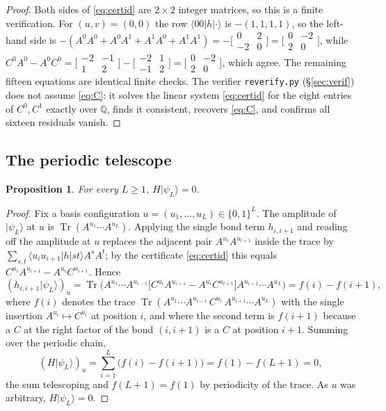 \documentclass[11pt]{amsart}
\newcommand{\Tr}{\operatorname{Tr}}
\newcommand{\ket}[1]{\lvert #1 \rangle}
\newcommand{\bra}[1]{\langle #1 \rvert}
\newcommand{\psiL}{\ket{\psi_L}}
\theoremstyle{plain}
\newtheorem{proposition}[theorem]{Proposition}
\theoremstyle{definition}
\theoremstyle{remark}
\begin{document}
\begin{proof}
Both sides of \eqref{eq:certid} are $2\times2$ integer matrices, so this is
a finite verification. For $(u,v)=(0,0)$ the row $\bra{00}h\ket{\cdot}$ is
$-(1,1,1,1)$, so the left-hand side is
$-(A^0A^0+A^0A^1+A^1A^0+A^1A^1)
=-\bigl[\begin{smallmatrix}0&2\\-2&0\end{smallmatrix}\bigr]
=\bigl[\begin{smallmatrix}0&-2\\2&0\end{smallmatrix}\bigr]$,
while $C^0A^0-A^0C^0
=\bigl[\begin{smallmatrix}-2&-1\\1&2\end{smallmatrix}\bigr]
-\bigl[\begin{smallmatrix}-2&1\\-1&2\end{smallmatrix}\bigr]
=\bigl[\begin{smallmatrix}0&-2\\2&0\end{smallmatrix}\bigr]$, which agree. The
remaining fifteen equations are identical finite checks. The verifier
\texttt{reverify.py} (\S\ref{sec:verif}) does not assume \eqref{eq:C}: it
solves the linear system \eqref{eq:certid} for the eight entries of
$C^0,C^1$ exactly over $\mathbb{Q}$, finds it consistent, recovers
\eqref{eq:C}, and confirms all sixteen residuals vanish.
\end{proof}

\subsection{The periodic telescope}\label{ssec:telescope}

\begin{proposition}\label{prop:allL}
For every $L\ge 1$, $H\psiL=0$.
\end{proposition}

\begin{proof}
Fix a basis configuration $u=(u_1,\dots,u_L)\in\{0,1\}^L$. The amplitude of
$\psiL$ at $u$ is $\Tr(A^{u_1}\cdots A^{u_L})$. Applying the single bond
term $h_{i,i+1}$ and reading off the amplitude at $u$ replaces the adjacent
pair $A^{u_i}A^{u_{i+1}}$ inside the trace by
$\sum_{s,t}\bra{u_i u_{i+1}}h\ket{st}A^{s}A^{t}$; by the certificate
\eqref{eq:certid} this equals $C^{u_i}A^{u_{i+1}}-A^{u_i}C^{u_{i+1}}$. Hence
\[
(h_{i,i+1}\psiL)_u
=\Tr\!\bigl(A^{u_1}\cdots A^{u_{i-1}}
\bigl[C^{u_i}A^{u_{i+1}}-A^{u_i}C^{u_{i+1}}\bigr]
A^{u_{i+2}}\cdots A^{u_L}\bigr)
= f(i)-f(i+1),
\]
where $f(i)$ denotes the trace $\Tr(A^{u_1}\cdots A^{u_{i-1}}\,C^{u_i}\,
A^{u_{i+1}}\cdots A^{u_L})$ with the single insertion $A^{u_i}\mapsto C^{u_i}$
at position $i$, and where the second term is $f(i+1)$ because a $C$ at the
right factor of the bond $(i,i+1)$ is a $C$ at position $i+1$. Summing over
the periodic chain,
\[
(H\psiL)_u=\sum_{i=1}^{L}\bigl(f(i)-f(i+1)\bigr)=f(1)-f(L+1)=0,
\]
the sum telescoping and $f(L+1)=f(1)$ by periodicity of the trace. As $u$
was arbitrary, $H\psiL=0$.
\end{proof}
\end{document}

